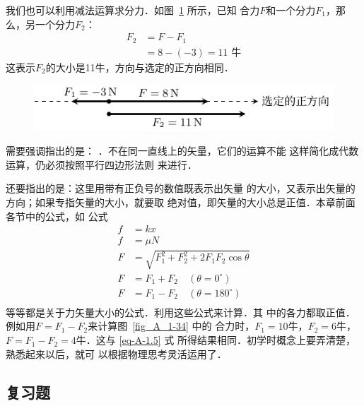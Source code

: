     我们也可以利用减法运算求分力．如图~\ref{fig_A_1-35} 所示，已知
合力$F$和一个分力$F_1$，那么，另一个分力$F_2$：
\begin{equation} 
\begin{split} 
F_2&=F-F_1\\
&=8-(-3)=11\text{ 牛} 
\end{split} 
\end{equation} 
这表示$F_2$的大小是11牛，方向与选定的正方向相同．

\begin{figure}[htbp]
	\centering
	\includegraphics{fig/A/1-35.pdf} 
	\caption{} \label{fig_A_1-35} 
\end{figure} 

需要强调指出的是： ．不在同一直线上的矢量，它们的运算不能
这样简化成代数运算，仍必须按照平行四边形法则
来进行．



    还要指出的是：这里用带有正负号的数值既表示出矢量
的大小，又表示出矢量的方向；如果专指矢量的大小，就要取
绝对值，即矢量的大小总是正值．本章前面各节中的公式，如
公式
\[\begin{split} 
f&=kx\\
f&=\mu N\\
F&=\sqrt{F^2_1+F^2_2+2F_1F_2\cos\theta} \\
F&=F_1+F_2\quad (\theta =0^\circ)\\
F&=F_1-F_2\quad (\theta =180^\circ)\\
\end{split}  \]
等等都是关于力矢量大小的公式．利用这些公式来计算．其
中的各力都取正值．例如用$F=F_1-F_2$来计算图~\ref{fig_A_1-34} 中的
合力时，$F_1=10$牛，$F_2=6$牛，$F=F_1-F_2=4$牛．这与 \eqref{eq-A-1.5} 式
所得结果相同．初学时概念上要弄清楚，熟悉起来以后，就可
以根据物理思考灵活运用了．


\subsection*{复习题} 

